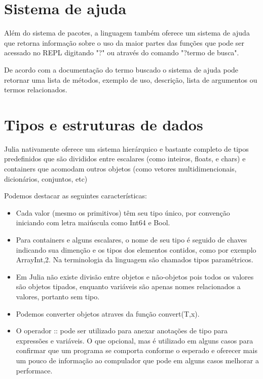 \section{Sistema de ajuda}
Além do sistema de pacotes, a linguagem também oferece um sistema de ajuda que retorna informação sobre o uso da maior partes das funções que pode ser acessado no REPL digitando "?" ou através do comando "?{termo de busca}". 

De acordo com a documentação do termo buscado o sistema de ajuda pode retornar uma lista de métodos, exemplo de uso, descrição, lista de argumentos ou termos relacionados.
\section{Tipos e estruturas de dados}
Julia nativamente oferece um sistema hierárquico e bastante completo de tipos predefinidos que são divididos entre escalares (como inteiros, floats, e chars) e containers que acomodam outros objetos (como vetores multidimencionais, dicionários, conjuntos, etc)

Podemos destacar as seguintes características: 
\begin{itemize}
    \item Cada valor (mesmo os primitivos) têm seu tipo único, por convenção iniciando com letra maiúscula como Int64 e Bool. 
    \item Para containers e alguns escalares, o nome de seu tipo é seguido de chaves indicando sua dimenção e os tipos dos elementos contidos, como por exemplo Array{Int,2}. Na terminologia da linguagem são chamados tipos paramétricos.  
    \item Em Julia não existe divisão entre objetos e não-objetos pois todos os valores são objetos tipados, enquanto variáveis são apenas nomes relacionados a valores, portanto sem tipo. 
    \item Podemos converter objetos atraves da função convert(T,x).
    \item O operador :: pode ser utilizado para anexar anotações de tipo para expressões e variáveis. O que opcional, mas é utilizado em alguns casos para confirmar que um programa se comporta conforme o esperado e oferecer mais um pouco de informação ao compulador que pode em alguns casos melhorar a performace. 
\end{itemize}

